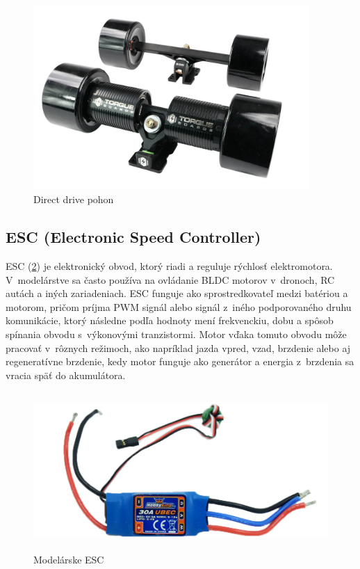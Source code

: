 \begin{figure}[h]
    \centering
    \includegraphics[height=7cm, width=1\linewidth, keepaspectratio]{figures/drive-direct.png}
    \caption{Direct drive pohon\cite{TorqueBoards}}\label{fig:direct-drive}
\end{figure}

\newpage

\subsection{ESC (Electronic Speed Controller)}
ESC (\ref{fig:esc}) je elektronický obvod, ktorý riadi a reguluje rýchlosť elektromotora.
V~modelárstve sa často používa na ovládanie BLDC motorov v~dronoch, RC autách a iných zariadeniach. 
ESC funguje ako sprostredkovateľ medzi batériou a motorom, pričom príjma PWM signál alebo signál z~iného podporovaného druhu komunikácie, ktorý následne podľa hodnoty mení frekvenckiu, dobu a spôsob spínania obvodu s~výkonovými tranzistormi.
Motor vďaka tomuto obvodu môže pracovať v~rôznych režimoch, ako napríklad jazda vpred, vzad, brzdenie alebo aj regeneratívne brzdenie, kedy motor funguje ako generátor a energia z~brzdenia sa vracia späť do akumulátora.\cite{Lauren}

\begin{figure}[h]
    \centering
    \includegraphics[height=6cm]{figures/esc.png}
    \caption{Modelárske ESC\cite{Lauren}}\label{fig:esc}
\end{figure}

